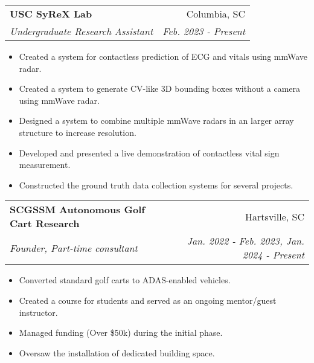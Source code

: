 \documentclass[letterpaper,11pt]{article}
\makeatletter
\newcommand{\resumeItem}[2]{
  \item\small{
    \textbf{#1}{: #2 \vspace{-2pt}}
  }
}
\newcommand{\resumeItemLine}[1]{
  \item\small{
    {#1 \vspace{-2pt}}
  }
}
\newcommand{\resumeSubheading}[4]{
  \vspace{-1pt}\item
    \begin{tabular*}{0.97\textwidth}{l@{\extracolsep{\fill}}r}
      \textbf{#1} & #2 \\
      \textit{\small#3} & \textit{\small #4} \\
    \end{tabular*}\vspace{-5pt}
}
\newcommand{\resumeItemListStart}{\begin{itemize}}
\newcommand{\resumeItemListEnd}{\end{itemize}\vspace{-5pt}}
\makeatother
\begin{document}
    \resumeSubheading
      {USC SyReX Lab}{Columbia, SC}
      {Undergraduate Research Assistant}{Feb. 2023 - Present}
      \resumeItemListStart
        \resumeItemLine{Created a system for contactless prediction of ECG and vitals using mmWave radar.}
        \resumeItemLine{Created a system to generate CV-like 3D bounding boxes without a camera using mmWave radar.} %
        \resumeItemLine{Designed a system to combine multiple mmWave radars in an larger array structure to increase resolution.}
        \resumeItemLine{Developed and presented a live demonstration of contactless vital sign measurement.}
        \resumeItemLine{Constructed the ground truth data collection systems for several projects.}

      \resumeItemListEnd


    \resumeSubheading
      {SCGSSM Autonomous Golf Cart Research}{Hartsville, SC}
      {Founder, Part-time consultant}{Jan. 2022 - Feb. 2023, Jan. 2024 - Present}
      \resumeItemListStart
        \resumeItemLine{Converted standard golf carts to ADAS-enabled vehicles.}
        \resumeItemLine{Created a course for students and served as an ongoing mentor/guest instructor.}
        \resumeItemLine{Managed funding (Over \$50k) during the initial phase. }
        \resumeItemLine{Oversaw the installation of dedicated building space.}
      \resumeItemListEnd
  
\end{document}
